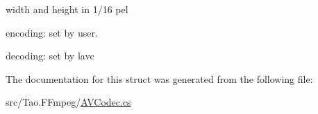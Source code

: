 \label{struct_tao_1_1_f_fmpeg_1_1_f_fmpeg_1_1_a_v_pan_scan_a5b6b3ba6fed75218cebb4edd6113643a}
width and height in 1/16 pel
\begin{DoxyItemize}
\item encoding: set by user.
\item decoding: set by lavc 
\end{DoxyItemize}

The documentation for this struct was generated from the following file:\begin{DoxyCompactItemize}
\item 
src/Tao.FFmpeg/\hyperlink{_a_v_codec_8cs}{AVCodec.cs}\end{DoxyCompactItemize}
